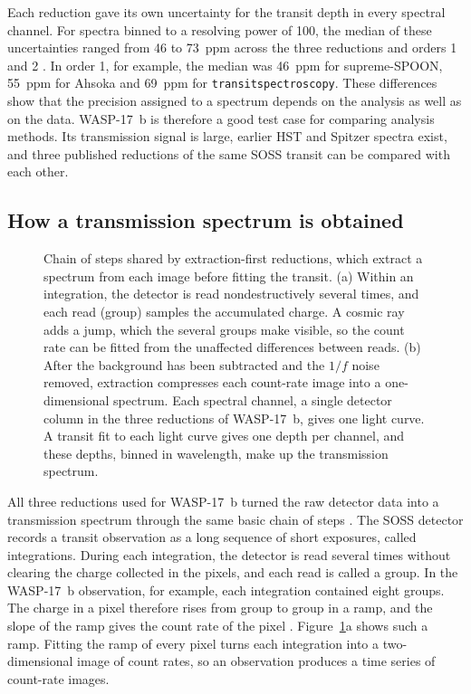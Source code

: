 Each reduction gave its own uncertainty for the transit depth in every
spectral channel. For spectra binned to a resolving power of 100, the median
of these uncertainties ranged from 46 to 73~ppm across the three reductions
and orders 1 and 2 \citep{LouieEtAl2025}. In order 1, for example, the median
was 46~ppm for supreme-SPOON, 55~ppm for Ahsoka and 69~ppm for
\texttt{transitspectroscopy}. These differences show that the precision
assigned to a spectrum depends on the analysis as well as on the data.
WASP-17~b is therefore a good test case for comparing analysis methods. Its
transmission signal is large, earlier HST and Spitzer spectra exist, and three
published reductions of the same SOSS transit can be compared with each other.

\subsection{How a transmission spectrum is obtained}
\label{sec:detector-to-spectrum}

\begin{figure}[t]
  \centering
  
  \caption{Chain of steps shared by extraction-first reductions, which extract
  a spectrum from each image before fitting the transit. (a) Within an
  integration, the detector is read nondestructively several times, and each
  read (group) samples the accumulated charge. A cosmic ray adds a jump, which
  the several groups make visible, so the count rate can be fitted from the
  unaffected differences between reads. (b) After the background has been
  subtracted and the $1/f$ noise removed, extraction compresses each
  count-rate image into a one-dimensional spectrum. Each spectral channel, a
  single detector column in the three reductions of WASP-17~b, gives one light
  curve. A transit fit to each light curve gives one depth per channel, and
  these depths, binned in wavelength, make up the transmission spectrum.}
  \label{fig:extraction-first-workflow}
\end{figure}

All three reductions used for WASP-17~b turned the raw detector data into a
transmission spectrum through the same basic chain of steps
\citep{LouieEtAl2025}. The SOSS detector records a transit observation as a
long sequence of short exposures, called integrations. During each
integration, the detector is read several times without clearing the charge
collected in the pixels, and each read is called a group. In the WASP-17~b
observation, for example, each integration contained eight groups. The charge
in a pixel therefore rises from group to group in a ramp, and the slope of the
ramp gives the count rate of the pixel \citep{AlbertEtAl2023}.
Figure~\ref{fig:extraction-first-workflow}a shows such a ramp. Fitting the
ramp of every pixel turns each integration into a two-dimensional image of
count rates, so an observation produces a time series of count-rate images.

